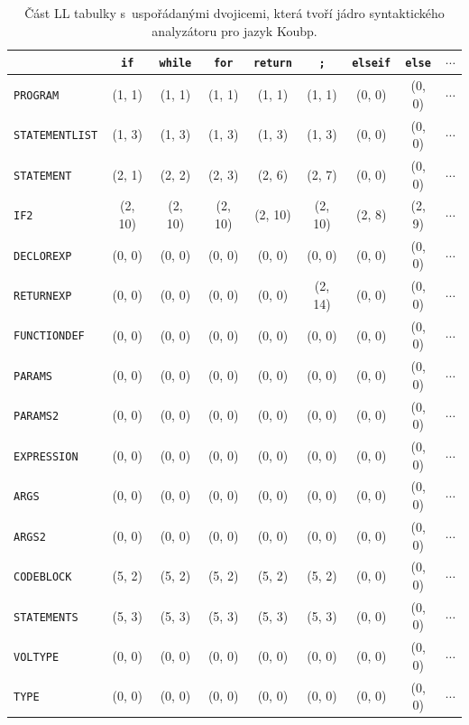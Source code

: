 \begin{table}[h]
	\centering
	\begin{tabularx}{\textwidth}{|l|c|c|c|c|c|c|c|c}
		\hline
		& \texttt{if} & \texttt{while} & \texttt{for} & \texttt{return} & \texttt{;} & \texttt{elseif} & \texttt{else} & $\cdots$ \\
		\hline
		\texttt{PROGRAM} & (1, 1) & (1, 1) & (1, 1) & (1, 1) & (1, 1) & (0, 0) & (0, 0) & $\cdots$\\
		\hline
		\texttt{STATEMENTLIST} & (1, 3) & (1, 3) & (1, 3) & (1, 3) & (1, 3) & (0, 0) & (0, 0) & $\cdots$\\
		\hline
		\texttt{STATEMENT} & (2, 1) & (2, 2) & (2, 3) & (2, 6) & (2, 7) & (0, 0) & (0, 0) & $\cdots$\\
		\hline
		\texttt{IF2} & (2, 10) & (2, 10) & (2, 10) & (2, 10) & (2, 10) & (2, 8) & (2, 9) & $\cdots$\\
		\hline
		\texttt{DECLOREXP} & (0, 0) & (0, 0) & (0, 0) & (0, 0) & (0, 0) & (0, 0) & (0, 0) & $\cdots$\\
		\hline
		\texttt{RETURNEXP} & (0, 0) & (0, 0) & (0, 0) & (0, 0) & (2, 14) & (0, 0) & (0, 0) & $\cdots$\\
		\hline
		\texttt{FUNCTIONDEF} & (0, 0) & (0, 0) & (0, 0) & (0, 0) & (0, 0) & (0, 0) & (0, 0) &$\cdots$ \\
		\hline
		\texttt{PARAMS} & (0, 0) & (0, 0) & (0, 0) & (0, 0) & (0, 0) & (0, 0) & (0, 0) & $\cdots$\\
		\hline
		\texttt{PARAMS2} & (0, 0) & (0, 0) & (0, 0) & (0, 0) & (0, 0) & (0, 0) & (0, 0) & $\cdots$\\
		\hline
		\texttt{EXPRESSION} & (0, 0) & (0, 0) & (0, 0) & (0, 0) & (0, 0) & (0, 0) & (0, 0) & $\cdots$ \\
		\hline
		\texttt{ARGS} & (0, 0) & (0, 0) & (0, 0) & (0, 0) & (0, 0) & (0, 0) & (0, 0) & $\cdots$ \\
		\hline
		\texttt{ARGS2} & (0, 0) & (0, 0) & (0, 0) & (0, 0) & (0, 0) & (0, 0) & (0, 0) & $\cdots$ \\
		\hline
		\texttt{CODEBLOCK} & (5, 2) & (5, 2) & (5, 2) & (5, 2) & (5, 2) & (0, 0) & (0, 0)& $\cdots$ \\
		\hline
		\texttt{STATEMENTS} & (5, 3) & (5, 3) & (5, 3) & (5, 3) & (5, 3) & (0, 0) & (0, 0) & $\cdots$ \\
		\hline
		\texttt{VOLTYPE} & (0, 0) & (0, 0) & (0, 0) & (0, 0) & (0, 0) & (0, 0) & (0, 0) & $\cdots$ \\
		\hline
		\texttt{TYPE} & (0, 0) & (0, 0) & (0, 0) & (0, 0) & (0, 0) & (0, 0) & (0, 0)& $\cdots$ \\
		\hline
	\end{tabularx}
	\caption{Část LL tabulky s~uspořádanými dvojicemi, která tvoří jádro syntaktického analyzátoru pro jazyk Koubp.}
	\label{tab_ll_table_priloha}
\end{table}





%
